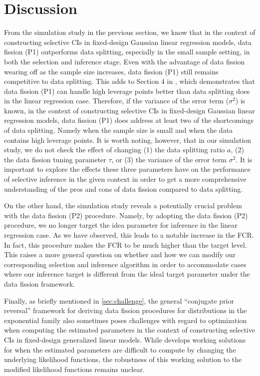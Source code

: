 \section{Discussion}
From the simulation study in the previous section, we know that in the context of constructing selective CIs in fixed-design Gaussian linear regression models, data fission (P1) outperforms data splitting, especially in the small sample setting, in both the selection and inference stage. Even with the advantage of data fission wearing off as the sample size increases, data fission (P1) still remains competitive to data splitting. This adds to Section 4 in \cite{leiner2022data}, which demonstrates that data fission (P1) can handle high leverage points better than data splitting does in the linear regression case. Therefore, if the variance of the error term ($\sigma^2$) is known, in the context of constructing selective CIs in fixed-design Gaussian linear regression models, data fission (P1) does address at least two of the shortcomings of data splitting. Namely when the sample size is small and when the data contains high leverage points. It is worth noting, however, that in our simulation study, we do not check the effect of changing (1) the data splitting ratio $a$, (2) the data fission tuning parameter $\tau$, or (3) the variance of the error term $\sigma^2$. It is important to explore the effects these three parameters have on the performance of selective inference in the given context in order to get a more comprehensive understanding of the pros and cons of data fission compared to data splitting.

On the other hand, the simulation study reveals a potentially crucial problem with the data fission (P2) procedure. Namely, by adopting the data fission (P2) procedure, we no longer target the idea parameter for inference in the linear regression case. As we have observed, this leads to a notable increase in the FCR. In fact, this procedure makes the FCR to be much higher than the target level. This raises a more general question on whether and how we can modify our corresponding selection and inference algorithm in order to accommodate cases where our inference target is different from the ideal target parameter under the data fission framework.

Finally, as briefly mentioned in \cref{sec:challenge}, the general ``conjugate prior reversal'' framework for deriving data fission procedures for distributions in the exponential family also sometimes poses challenges with regard to optimization when computing the estimated parameters in the context of constructing selective CIs in fixed-design generalized linear models. While \cite{leiner2022data} develops working solutions for when the estimated parameters are difficult to compute by changing the underlying likelihood functions, the robustness of this working solution to the modified likelihood functions remains unclear.

